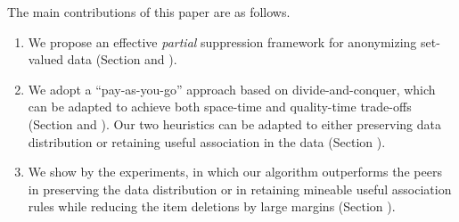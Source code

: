 The main contributions of this paper are as follows.
\begin{enumerate}
\item We propose an effective \emph{partial} suppression framework for anonymizing set-valued data (Section  and ).
\item We adopt a ``pay-as-you-go'' approach based on divide-and-conquer,
    which can be adapted to achieve both space-time and quality-time
    trade-offs (Section  and ). Our two heuristics
    can be adapted to either preserving data distribution or retaining useful
    association in the data (Section ).
\item We show by the experiments, in which our algorithm outperforms
    the peers in preserving the data distribution or in retaining mineable useful association rules while reducing the item deletions by large margins (Section ).
\end{enumerate}
